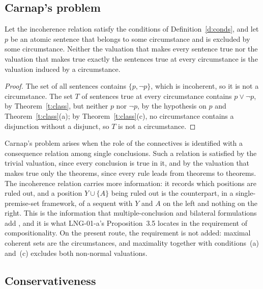 \documentclass{situationist-preprint}
\begin{document}
\subsection{Carnap's problem}

\begin{proposition}\label{p:carnap}
Let the incoherence relation satisfy the conditions of Definition~\ref{d:conds}, and let $p$ be an atomic sentence that belongs to some circumstance and is excluded by some circumstance. Neither the valuation that makes every sentence true nor the valuation that makes true exactly the sentences true at every circumstance is the valuation induced by a circumstance.
\end{proposition}

\begin{proof}
The set of all sentences contains $\{p, \neg p\}$, which is incoherent, so it is not a circumstance. The set $T$ of sentences true at every circumstance contains $p \vee \neg p$, by Theorem~\ref{t:class}, but neither $p$ nor $\neg p$, by the hypothesis on $p$ and Theorem~\ref{t:class}(a); by Theorem~\ref{t:class}(c), no circumstance contains a disjunction without a disjunct, so $T$ is not a circumstance.
\end{proof}

Carnap's problem arises when the role of the connectives is identified with a consequence relation among single conclusions. Such a relation is satisfied by the trivial valuation, since every conclusion is true in it, and by the valuation that makes true only the theorems, since every rule leads from theorems to theorems. The incoherence relation carries more information: it records which positions are ruled out, and a position $Y \cup \{A\}$ being ruled out is the counterpart, in a single-premise-set framework, of a sequent with $Y$ and $A$ on the left and nothing on the right. This is the information that multiple-conclusion and bilateral formulations add \citep{Smiley1996,Rumfitt2000,MurziHjortland2009}, and it is what LNG-01-a's Proposition~3.5 locates in the requirement of compositionality. On the present route, the requirement is not added: maximal coherent sets are the circumstances, and maximality together with conditions~(a) and~(c) excludes both non-normal valuations.

\subsection{Conservativeness}
\end{document}
